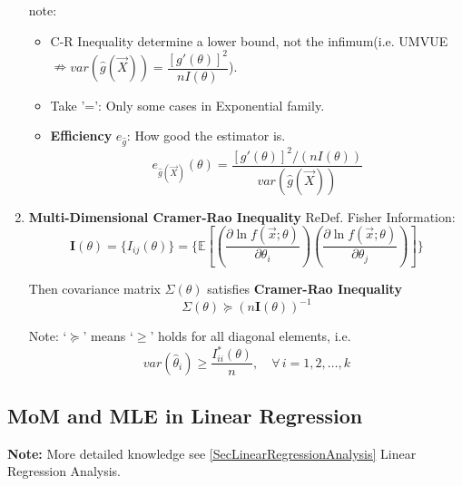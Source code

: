 \begin{enumerate}[topsep=2pt,itemsep=0pt]
        note:
        \begin{itemize}
            \item C-R Inequality determine a lower bound, not the infimum(i.e. UMVUE$\nRightarrow var(\hat{g}(\vec{X}))=\dfrac{[g'(\theta)]^2}{nI(\theta)}$).
            \item Take '=': Only some cases in Exponential family.
            \item \textbf{Efficiency} $ e_{\hat{g}} $: How good the estimator is.
            \begin{equation}
                e_{\hat{g}(\vec{X})}(\theta)=   \frac{[g'(\theta)]^2/(nI(\theta))}{var(\hat{g}(\vec{X}))} 
            \end{equation} 
        \end{itemize}


    \item \textbf{Multi-Dimensional Cramer-Rao Inequality}
        ReDef. Fisher Information:
        \begin{equation}
            \bm{I}(\theta)=\{I_{ij}(\theta)\}=\{\mathbb{E}\left[\left(\frac{\partial\ln f(\vec{x};\theta)}{\partial\theta_i}\right)\left(\frac{\partial\ln f(\vec{x};\theta)}{\partial\theta_j}\right)\right]\}  
        \end{equation}

        Then covariance matrix $\Sigma(\theta)$ satisfies \textbf{Cramer-Rao Inequality}
        \begin{equation}
            \Sigma(\theta)\succeq  (n\bm{I}(\theta))^{-1}
        \end{equation}

        Note: `$\succeq $' means `$ \geq $' holds for all diagonal elements, i.e.
    \begin{equation}
        var(\hat{\theta}_i)\geq \frac{I^*_{ii}(\theta)}{n},\quad \forall\,i=1,2,\ldots,k  
    \end{equation}


        
    \end{enumerate}






\subsection{MoM and MLE in Linear Regression}\label{SubSectionMoM_MLE_LinearRegression}
    \textbf{Note:} More detailed knowledge see \autoref{SecLinearRegressionAnalysis} Linear Regression Analysis.

